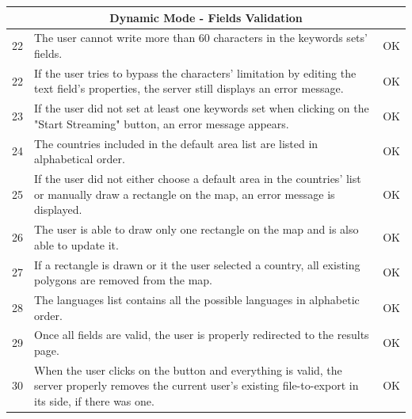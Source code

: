 \documentclass[a4paper,11pt]{report}
\begin{document}
\begin{center}
\begin{longtable}{|l|p{10cm}|p{4.4cm}|}
	\multicolumn{3}{|c|}{\textbf{Dynamic Mode - Fields Validation}}\\\hline	
	22 & The user cannot write more than 60 characters in the keywords sets' fields. & \color{ForestGreen}OK\color{black}\\\hline
	22 & If the user tries to bypass the characters' limitation by editing the text field's properties, the server still displays an error message. & \color{ForestGreen}OK\color{black}\\\hline
	23 & If the user did not set at least one keywords set when clicking on the "Start Streaming" button, an error message appears. & \color{ForestGreen}OK\color{black}\\\hline
	24 & The countries included in the default area list are listed in alphabetical order. & \color{ForestGreen}OK\color{black}\\\hline
	25 & If the user did not either choose a default area in the countries' list or manually draw a rectangle on the map, an error message is displayed. & \color{ForestGreen}OK\color{black}\\\hline
	26 & The user is able to draw only one rectangle on the map and is also able to update it. & \color{ForestGreen}OK\color{black}\\\hline
	27 & If a rectangle is drawn or it the user selected a country, all existing polygons are removed from the map. & \color{ForestGreen}OK\color{black}\\\hline
	28 & The languages list contains all the possible languages in alphabetic order. & \color{ForestGreen}OK\color{black}\\\hline
	29 & Once all fields are valid, the user is properly redirected to the results page. & \color{ForestGreen}OK\color{black}\\\hline
	30 & When the user clicks on the button and everything is valid, the server properly removes the current user's existing file-to-export in its side, if there was one. & \color{ForestGreen}OK\color{black}\\\hline
	

\end{longtable}
\end{center}
\end{document}
